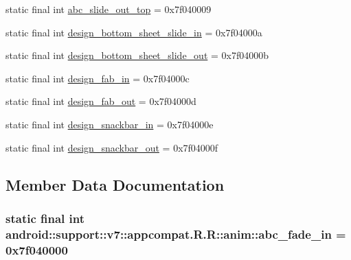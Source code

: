 \begin{CompactItemize}
static final int \hyperlink{classandroid_1_1support_1_1v7_1_1appcompat_1_1_r_1_1anim_38fb846f4fe9fdc3e76e64611b52e549}{abc\_\-slide\_\-out\_\-top} = 0x7f040009
\item 
static final int \hyperlink{classandroid_1_1support_1_1v7_1_1appcompat_1_1_r_1_1anim_9007677e3a75fbf92057ce58691edbd1}{design\_\-bottom\_\-sheet\_\-slide\_\-in} = 0x7f04000a
\item 
static final int \hyperlink{classandroid_1_1support_1_1v7_1_1appcompat_1_1_r_1_1anim_8bd9c028736ea04494d1d9ccdbd97c21}{design\_\-bottom\_\-sheet\_\-slide\_\-out} = 0x7f04000b
\item 
static final int \hyperlink{classandroid_1_1support_1_1v7_1_1appcompat_1_1_r_1_1anim_83538513fddafb563f069b29e4761b5f}{design\_\-fab\_\-in} = 0x7f04000c
\item 
static final int \hyperlink{classandroid_1_1support_1_1v7_1_1appcompat_1_1_r_1_1anim_210c4f63c1d844f72c44b0e29d3e41ef}{design\_\-fab\_\-out} = 0x7f04000d
\item 
static final int \hyperlink{classandroid_1_1support_1_1v7_1_1appcompat_1_1_r_1_1anim_1e0a7735a626e9320423d47496abdf5a}{design\_\-snackbar\_\-in} = 0x7f04000e
\item 
static final int \hyperlink{classandroid_1_1support_1_1v7_1_1appcompat_1_1_r_1_1anim_8a05573fcb0e55e1feb33e2707d0514a}{design\_\-snackbar\_\-out} = 0x7f04000f
\end{CompactItemize}


\subsection{Member Data Documentation}
\hypertarget{classandroid_1_1support_1_1v7_1_1appcompat_1_1_r_1_1anim_3fe83bd68712426bfdb47a543f274bce}{
\subsubsection[{abc\_\-fade\_\-in}]{\setlength{\rightskip}{0pt plus 5cm}static final int android::support::v7::appcompat.R.R::anim::abc\_\-fade\_\-in = 0x7f040000}}
\label{classandroid_1_1support_1_1v7_1_1appcompat_1_1_r_1_1anim_3fe83bd68712426bfdb47a543f274bce}


